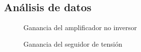\subsection{Análisis de datos}

\begin{figure}[H]
    \centering
    
    \caption{Ganancia del amplificador no inversor}
    \label{fig:2-analisis:ganancia-opamp}
\end{figure}

\begin{figure}[H]
    \centering
    
    \caption{Ganancia del seguidor de tensión}
    \label{fig:2-analisis:ganancia-seguidor}
\end{figure}
